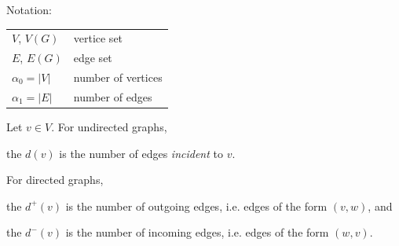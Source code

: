 Notation: \\[\medskipamount]
\begin{tabular}{ll}
  $V$, $V(G)$ & vertice set \\
  $E$, $E(G)$ & edge set \\
  $\alpha_0 = |V|$ & number of vertices \\
  $\alpha_1 = |E|$ & number of edges \\
\end{tabular}

\begin{definition}
Let $v\in V$. For undirected graphs, 
\begin{compactitem}
  \item the  $d(v)$ is the number of edges \emph{incident} to $v$.
\end{compactitem}
For directed graphs,
\begin{compactitem}
  \item the  $d^{+}(v)$ is the number of outgoing edges, i.e. edges of the form $(v,w)$, and
  \item the  $d^{-}(v)$ is the number of incoming edges, i.e. edges of the form $(w,v)$.
\end{compactitem}
\end{definition}

